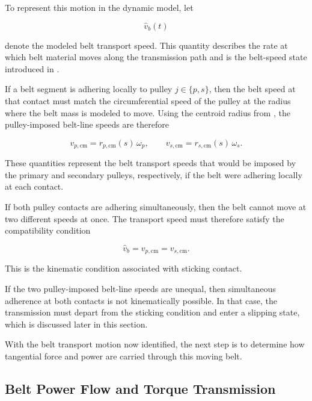 \documentclass[11pt]{article}
\numberwithin{equation}{section}
\begin{document}
To represent this motion in the dynamic model, let

\[
\hat{v}_b(t)
\]

denote the modeled belt transport speed. This quantity describes the rate at
which belt material moves along the transmission path and is the belt-speed
state introduced in .

If a belt segment is adhering locally to pulley \(j \in \{p,s\}\), then the
belt speed at that contact must match the circumferential speed of the pulley
at the radius where the belt mass is modeled to move. Using the centroid
radius from , the pulley-imposed belt-line speeds are therefore

\begin{equation}
v_{p,\mathrm{cm}}
=
r_{p,\mathrm{cm}}(s)\,\omega_p,
\qquad
v_{s,\mathrm{cm}}
=
r_{s,\mathrm{cm}}(s)\,\omega_s.
\label{eq:belt_line_speeds}
\end{equation}

These quantities represent the belt transport speeds that would be imposed by
the primary and secondary pulleys, respectively, if the belt were adhering
locally at each contact.

If both pulley contacts are adhering simultaneously, then the belt cannot move
at two different speeds at once. The transport speed must therefore satisfy the
compatibility condition

\begin{equation}
\hat{v}_b
=
v_{p,\mathrm{cm}}
=
v_{s,\mathrm{cm}}.
\label{eq:vb_stick_compatibility}
\end{equation}

This is the kinematic condition associated with sticking contact.

If the two pulley-imposed belt-line speeds are unequal, then simultaneous
adherence at both contacts is not kinematically possible. In that case, the
transmission must depart from the sticking condition and enter a slipping
state, which is discussed later in this section.

With the belt transport motion now identified, the next step is to determine
how tangential force and power are carried through this moving belt.


\subsection{Belt Power Flow and Torque Transmission}
\end{document}
